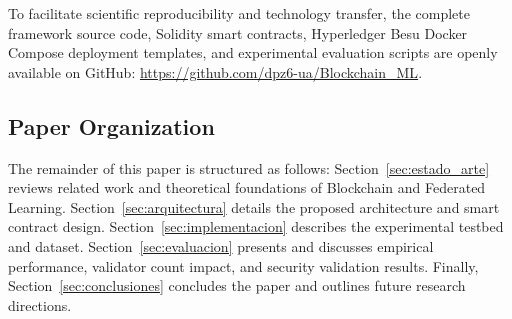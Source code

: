 To facilitate scientific reproducibility and technology transfer, the complete framework source code, Solidity smart contracts, Hyperledger Besu Docker Compose deployment templates, and experimental evaluation scripts are openly available on GitHub: \url{https://github.com/dpz6-ua/Blockchain_ML}.

\subsection{Paper Organization}
The remainder of this paper is structured as follows: Section~\ref{sec:estado_arte} reviews related work and theoretical foundations of Blockchain and Federated Learning. Section~\ref{sec:arquitectura} details the proposed architecture and smart contract design. Section~\ref{sec:implementacion} describes the experimental testbed and dataset. Section~\ref{sec:evaluacion} presents and discusses empirical performance, validator count impact, and security validation results. Finally, Section~\ref{sec:conclusiones} concludes the paper and outlines future research directions.
